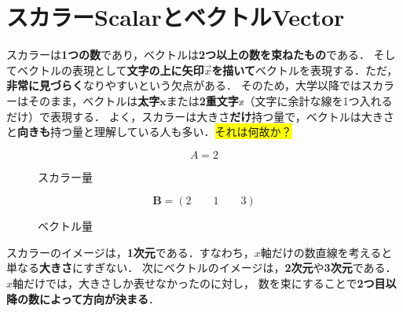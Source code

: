 \documentclass[a4paper,11pt]{ltjsarticle}
\numberwithin{equation}{section}
\begin{document}
\section{スカラーScalarとベクトルVector}
\label{sec: sca-vec}

スカラーは\textbf{1つの数}であり，ベクトルは\textbf{2つ以上の数を束ねたもの}である．
そしてベクトルの表現として\textbf{文字の上に矢印$\vec{x}$を描いて}ベクトルを表現する．ただ，\textbf{非常に見づらく}なりやすいという欠点がある．
そのため，大学以降ではスカラーはそのまま，ベクトルは\textbf{太字}$\bm{x}$または\textbf{2重文字}$\mathbb{x}$（文字に余計な線を1つ入れるだけ）で表現する．
よく，スカラーは大きさ\textbf{だけ}持つ量で，ベクトルは大きさと\textbf{向きも}持つ量と理解している人も多い．\colorbox{yellow}{それは何故か？}

\begin{figure}[htbp]
\centering
\begin{minipage}[b]{0.49\columnwidth}
  \centering
  \begin{equation*}
    A = 2
  \end{equation*}
  \caption{スカラー量}
  \label{eq: sca-quantity}
\end{minipage}
\begin{minipage}[b]{0.49\columnwidth}
  \centering
  \begin{equation*}
    \bm{B} = (2 \qquad 1 \qquad 3)
  \end{equation*}
  \caption{ベクトル量}
  \label{eq: vec-quantity}
\end{minipage}
\end{figure}

スカラーのイメージは，\textbf{1次元}である．すなわち，$x$軸だけの数直線を考えると単なる\textbf{大きさ}にすぎない．
次にベクトルのイメージは，\textbf{2次元}や\textbf{3次元}である．$x$軸だけでは，大きさしか表せなかったのに対し，
数を束にすることで\textbf{2つ目以降の数によって方向が決まる}．
\end{document}
